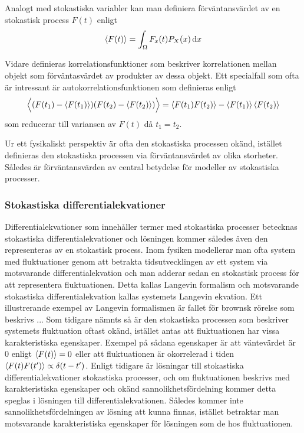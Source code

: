 Analogt med stokastiska variabler kan man definiera förväntansvärdet av en stokastisk process $F(t)$ enligt 
\begin{equation}
    \ev{F(t)} = \int_{\Omega} F_x(t)P_X(x) \id{x}
\end{equation}

Vidare definieras korrelationsfunktioner som beskriver korrelationen
mellan objekt som förväntasvärdet av produkter av dessa objekt. Ett
specialfall som ofta är intressant är
autokorrelationsfunktionen 
som definieras enligt
\begin{equation}
\Big\langle(F(t_1)-\ev{F(t_1)})(F(t_2)-\ev{F(t_2)})\Big\rangle 
= \ev{F(t_1)F(t_2)} - \ev{F(t_1)}\ev{F(t_2)}
\end{equation}
som reducerar till variansen av $F(t)$ då $t_1=t_2$.

Ur ett fysikaliskt perspektiv är ofta den stokastiska processen okänd, istället definieras den stokastiska processen via förväntansvärdet av olika storheter. Således är förväntansvärden av central betydelse för modeller av stokastiska processer. 


\subsubsection{Stokastiska differentialekvationer}
Differentialekvationer som innehåller termer med stokastiska processer
betecknas stokastiska differentialekvationer och lösningen kommer
således även den representeras av en stokastisk process. 
Inom fysiken modellerar man ofta system med fluktuationer genom att betrakta
tidsutvecklingen av ett system via motsvarande differentialekvation
och man adderar sedan en stokastisk process för att representera
fluktuationen. 
Detta kallas Langevin formalism och motsvarande
stokastiska differentialekvation kallas systemets Langevin ekvation. Ett
illustrerande exempel av Langevin formalismen är fallet för brownsk
rörelse som beskrivs ... 
Som tidigare nämnts så är den stokastiska
processen som beskriver systemets fluktuation oftast okänd, istället
antas att fluktuationen har vissa karakteristiska egenskaper. Exempel
på sådana egenskaper är att väntevärdet är $0$ enligt $\ev{F(t)} = 0$
eller att fluktuationen är okorrelerad i tiden
$\ev{F(t)F(t')}\propto\delta(t-t')$. Enligt tidigare
 är lösningar till
stokastiska differentialekvationer stokastiska processer, och om
fluktuationen beskrivs med karakteristiska egenskaper och okänd
sannolikhetsfördelning kommer detta speglas i lösningen till
differentialekvationen. Således kommer inte sannolikhetsfördelningen
av lösning att kunna finnas, istället betraktar man motsvarande
karakteristiska egenskaper för lösningen som de hos
fluktuationen.  
  
